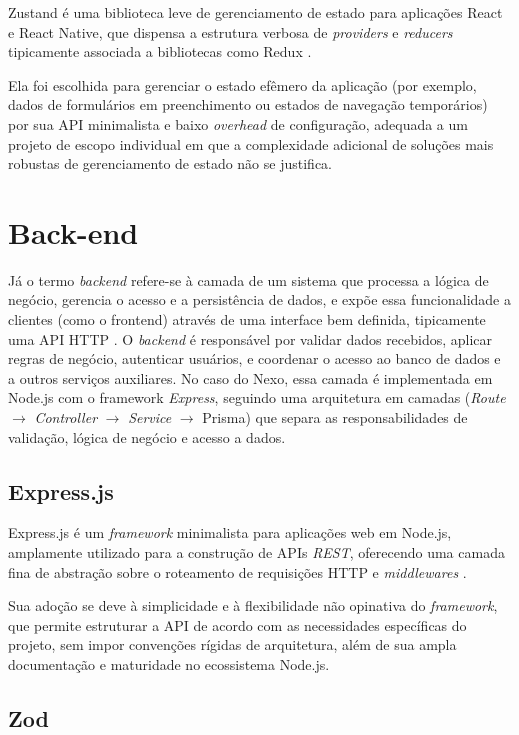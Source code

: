 Zustand é uma biblioteca leve de gerenciamento de estado para aplicações
React e React Native, que dispensa a estrutura verbosa de \textit{providers}
e \textit{reducers} tipicamente associada a bibliotecas como Redux
\citep{zustand:2026}.

Ela foi escolhida para gerenciar o estado efêmero da aplicação (por exemplo,
dados de formulários em preenchimento ou estados de navegação temporários)
por sua API minimalista e baixo \textit{overhead} de configuração, adequada a um
projeto de escopo individual em que a complexidade adicional de soluções
mais robustas de gerenciamento de estado não se justifica.

\section{Back-end}

Já o termo \textit{backend} refere-se à camada de um sistema que processa a
lógica de negócio, gerencia o acesso e a persistência de dados, e expõe essa
funcionalidade a clientes (como o frontend) através de uma interface bem
definida, tipicamente uma API HTTP \cite{Fowler_2013}. O \textit{backend} é
responsável por validar dados recebidos, aplicar regras de negócio, autenticar
usuários, e coordenar o acesso ao banco de dados e a outros serviços
auxiliares. No caso do Nexo, essa camada é implementada em Node.js com o
framework \textit{Express}, seguindo uma arquitetura em camadas (\textit{Route}
$\rightarrow$ \textit{Controller} $\rightarrow$ \textit{Service} $\rightarrow$
Prisma) que separa as responsabilidades de validação, lógica de negócio e
acesso a dados.

\subsection{Express.js}

Express.js é um \textit{framework} minimalista para aplicações web em
Node.js, amplamente utilizado para a construção de APIs \textit{REST},
oferecendo uma camada fina de abstração sobre o roteamento de requisições HTTP e
\textit{middlewares} \citep{express:2026}.

Sua adoção se deve à simplicidade e à flexibilidade não opinativa do
\textit{framework}, que permite estruturar a API de acordo com as
necessidades específicas do projeto, sem impor convenções rígidas de
arquitetura, além de sua ampla documentação e maturidade no ecossistema
Node.js.

\subsection{Zod}

